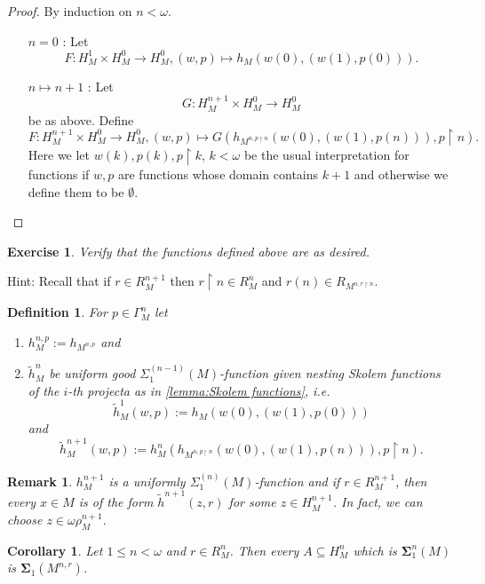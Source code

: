 \documentclass[12pt,a4paper]{article}
\theoremstyle{nicestyle}
\newtheorem{exercise}{Exercise}[subsection]
\newtheorem{definition}{Definition}[subsection]
\newtheorem{corollary}{Corollary}[subsection]
\newtheorem{remark}{Remark}[subsection]
\begin{document}
\begin{proof}
  By induction on $n < \omega$.
  \begin{itemize}
  \item[$n=0$ :] Let
    \[
      F \colon H^{1}_{M} \times H^{0}_{M} \to H^{0}_{M}, (w,p) \mapsto
      h_{M}(w(0),(w(1), p(0))).
    \]
  \item[$n \mapsto n+1$ :] Let
    \[
      G \colon H^{n+1}_{M} \times H^{0}_{M} \to H^{0}_{M}
    \]
    be as above. Define
    \[
      F \colon H^{n+1}_{M} \times H^{0}_{M} \to H^{0}_{M}, (w,p)
      \mapsto G(h_{M^{n, p \restriction n}}(w(0), (w(1), p(n))), p \restriction n).
    \]
    Here we let $w(k), p(k), p \restriction k$, $k < \omega$ be the
    usual interpretation for functions if $w,p$ are functions whose
    domain contains $k + 1$ and otherwise we define them to be
    $\emptyset$.
  \end{itemize}
\end{proof}

\begin{exercise}
  Verify that the functions defined above are as desired.
\end{exercise}

Hint: Recall that if $r \in R^{n+1}_M$ then
$r \restriction n \in R^{n}_M$ and
$r(n) \in R_{M^{n, r \restriction n}}$.

\begin{definition}
  For $p \in \Gamma^{n}_{M}$ let
  \begin{enumerate}
    \item $h^{n,p}_{M} := h_{M^{n,p}}$ and
    \item $\tilde{h}^{n}_{M}$ be uniform good
      $\Sigma^{(n-1)}_{1}(M)$-function given nesting Skolem functions
      of the $i$-th projecta as in \autoref{lemma:Skolem functions},
      i.e.
      \[
        \tilde{h}^{1}_{M}(w, p) := h_{M}(w(0), (w(1), p(0)))
      \]
      and
      \[
	\tilde{h}^{n+1}_{M}(w, p) := h^{n}_{M}( h_{M^{n, p
            \restriction n}}(w(0), (w(1), p(n))), p \restriction n).
      \]      
    \end{enumerate}
\end{definition}
\begin{remark}
  $h^{n+1}_{M}$ is a uniformly $\Sigma^{(n)}_{1}(M)$-function and if
  $r \in R^{n+1}_{M}$, then every $x \in M$ is of the form
  $\tilde{h}^{n+1}(z, r)$ for some $z \in H^{n+1}_{M}$. In fact, we
  can choose $z \in \omega \rho^{n+1}_{M}$.
\end{remark}

\begin{corollary} \label{cor:definability via very good parameters}
  Let $1 \le n < \omega$ and $r \in R^{n}_{M}$. Then every
  $A \subseteq H^{n}_{M}$ which is $\boldsymbol{\Sigma}^{n}_{1}(M)$ is
  $\boldsymbol{\Sigma}_{1}(M^{n,r})$.
\end{corollary}
\end{document}
